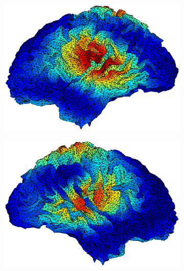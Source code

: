 \documentclass[doc,a4paper,12pt]{apa6}
\begin{document}
\begin{figure}
  \centering
  \captionsetup{justification=centering}
  \begin{subfigure}[c]{0.47\textwidth}
    \includegraphics[width=\textwidth]{ergebnisse/activity/pa07_eve2_raw_lcmv_activity_left.eps}
    \label{img:activity-latera:lcmv:left}
  \end{subfigure}\hspace*{0.04\textwidth}
  \begin{subfigure}[c]{0.47\textwidth}
    \includegraphics[width=\textwidth]{ergebnisse/activity/pa07_eve2_raw_lcmv_activity_right.eps}
    \label{img:activity-latera:lcmv:right}
  \end{subfigure}  

\end{figure}
\end{document}
